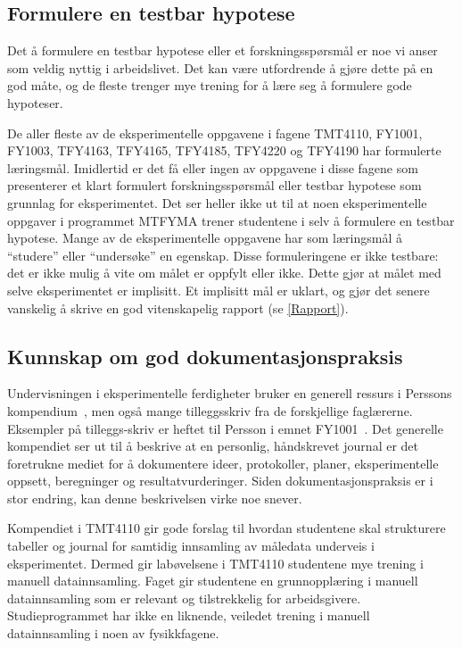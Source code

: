 \documentclass{article}
\begin{document}
\subsection{Formulere en testbar hypotese}
Det å formulere en testbar hypotese eller et forskningsspørsmål er noe vi anser som veldig nyttig i arbeidslivet. Det kan være utfordrende å gjøre dette på en god måte, og de fleste trenger mye trening for å lære seg å formulere gode hypoteser.

De aller fleste av de eksperimentelle oppgavene i fagene TMT4110, FY1001, FY1003, TFY4163, TFY4165, TFY4185, TFY4220 og TFY4190 har formulerte læringsmål. Imidlertid er det få eller ingen av oppgavene i disse fagene som presenterer et klart formulert forskningsspørsmål eller testbar hypotese som grunnlag for eksperimentet. Det ser heller ikke ut til at noen eksperimentelle oppgaver i programmet MTFYMA trener studentene i selv å formulere en testbar hypotese. Mange av de eksperimentelle oppgavene har som læringsmål å ``studere'' eller ``undersøke'' en egenskap. Disse formuleringene er ikke testbare: det er ikke mulig å vite om målet er oppfylt eller ikke. Dette gjør at målet med selve eksperimentet er implisitt. Et implisitt mål er uklart, og gjør det senere vanskelig å skrive en god vitenskapelig rapport (se \cref{Rapport}).

\subsection{Kunnskap om god dokumentasjonspraksis}
Undervisningen i eksperimentelle ferdigheter bruker en generell ressurs i Perssons kompendium~\cite{Persson2020}, men også mange tilleggsskriv fra de forskjellige faglærerne. Eksempler på tilleggs-skriv er heftet til Persson i emnet FY1001~\cite{Persson2020FY1001}. Det generelle kompendiet \cite{Persson2020} ser ut til å beskrive at en personlig, håndskrevet journal er det foretrukne mediet for å dokumentere ideer, protokoller, planer, eksperimentelle oppsett, beregninger og resultatvurderinger. Siden dokumentasjonspraksis er i stor endring, kan denne beskrivelsen virke noe snever.

 Kompendiet i TMT4110 gir gode forslag til hvordan studentene skal strukturere tabeller og journal for samtidig innsamling av måledata underveis i eksperimentet. Dermed gir labøvelsene i TMT4110 studentene mye trening i manuell datainnsamling. Faget gir studentene en grunnopplæring i manuell datainnsamling som er relevant og tilstrekkelig for arbeidsgivere. Studieprogrammet har ikke en liknende, veiledet trening i manuell datainnsamling i noen av fysikkfagene.
\end{document}
